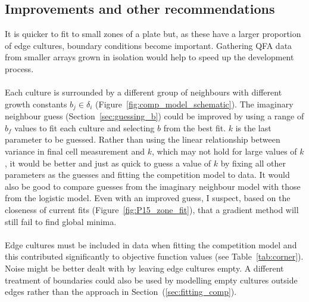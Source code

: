 \subsection{Improvements and other recommendations}

It is quicker to fit to small zones of a plate but, as these have a
larger proportion of edge cultures, boundary conditions become
important. Gathering QFA data from smaller arrays grown in isolation
would help to speed up the development process.
\\\\
Each culture is surrounded by a different group of neighbours with
different growth constants \(b_{j} \in \delta_{i}\)
(Figure~\ref{fig:comp_model_schematic}). The imaginary neighbour guess
(Section~\ref{sec:guessing_b}) could be improved by using a range of
\(b_{f}\) values to fit each culture and selecting \(b\) from the best
fit. \(k\) is the last parameter to be guessed. Rather than using the
linear relationship between variance in final cell measurement and
\(k\), which may not hold for large values of \(k\), it would be
better and just as quick to guess a value of \(k\) by fixing all other
parameters as the guesses and fitting the competition model to
data. It would also be good to compare guesses from the imaginary
neighbour model with those from the logistic model. Even with an
improved guess, I suspect, based on the closeness of current fits
(Figure~\ref{fig:P15_zone_fit}), that a gradient method will still
fail to find global minima.
\\\\
Edge cultures must be included in data when fitting the competition
model and this contributed significantly to objective function values
(see Table~\ref{tab:corner}). Noise might be better dealt with by
leaving edge cultures empty. A different treatment of boundaries could
also be used by modelling empty cultures outside edges rather than the
approach in Section~(\ref{sec:fitting_comp}).
\\\\
